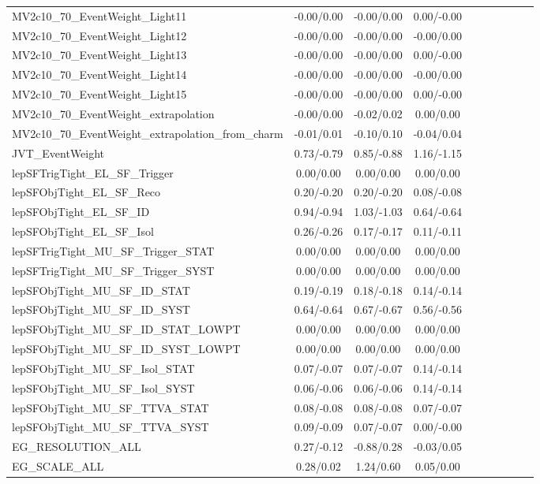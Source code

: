\begin{table}[h]
\begin{center}
\begin{tabular}{l|ccccccccc}
MV2c10\_70\_EventWeight\_Light11 &-0.00/0.00 &-0.00/0.00 &0.00/-0.00 \\
MV2c10\_70\_EventWeight\_Light12 &-0.00/0.00 &-0.00/0.00 &-0.00/0.00 \\
MV2c10\_70\_EventWeight\_Light13 &-0.00/0.00 &-0.00/0.00 &0.00/-0.00 \\
MV2c10\_70\_EventWeight\_Light14 &-0.00/0.00 &-0.00/0.00 &-0.00/0.00 \\
MV2c10\_70\_EventWeight\_Light15 &-0.00/0.00 &-0.00/0.00 &0.00/-0.00 \\
MV2c10\_70\_EventWeight\_extrapolation &-0.00/0.00 &-0.02/0.02 &0.00/0.00 \\
MV2c10\_70\_EventWeight\_extrapolation\_from\_charm &-0.01/0.01 &-0.10/0.10 &-0.04/0.04 \\
JVT\_EventWeight &0.73/-0.79 &0.85/-0.88 &1.16/-1.15 \\
lepSFTrigTight\_EL\_SF\_Trigger &0.00/0.00 &0.00/0.00 &0.00/0.00 \\
lepSFObjTight\_EL\_SF\_Reco &0.20/-0.20 &0.20/-0.20 &0.08/-0.08 \\
lepSFObjTight\_EL\_SF\_ID &0.94/-0.94 &1.03/-1.03 &0.64/-0.64 \\
lepSFObjTight\_EL\_SF\_Isol &0.26/-0.26 &0.17/-0.17 &0.11/-0.11 \\
lepSFTrigTight\_MU\_SF\_Trigger\_STAT &0.00/0.00 &0.00/0.00 &0.00/0.00 \\
lepSFTrigTight\_MU\_SF\_Trigger\_SYST &0.00/0.00 &0.00/0.00 &0.00/0.00 \\
lepSFObjTight\_MU\_SF\_ID\_STAT &0.19/-0.19 &0.18/-0.18 &0.14/-0.14 \\
lepSFObjTight\_MU\_SF\_ID\_SYST &0.64/-0.64 &0.67/-0.67 &0.56/-0.56 \\
lepSFObjTight\_MU\_SF\_ID\_STAT\_LOWPT &0.00/0.00 &0.00/0.00 &0.00/0.00 \\
lepSFObjTight\_MU\_SF\_ID\_SYST\_LOWPT &0.00/0.00 &0.00/0.00 &0.00/0.00 \\
lepSFObjTight\_MU\_SF\_Isol\_STAT &0.07/-0.07 &0.07/-0.07 &0.14/-0.14 \\
lepSFObjTight\_MU\_SF\_Isol\_SYST &0.06/-0.06 &0.06/-0.06 &0.14/-0.14 \\
lepSFObjTight\_MU\_SF\_TTVA\_STAT &0.08/-0.08 &0.08/-0.08 &0.07/-0.07 \\
lepSFObjTight\_MU\_SF\_TTVA\_SYST &0.09/-0.09 &0.07/-0.07 &0.00/-0.00 \\
EG\_RESOLUTION\_ALL &0.27/-0.12 &-0.88/0.28 &-0.03/0.05 \\
EG\_SCALE\_ALL &0.28/0.02 &1.24/0.60 &0.05/0.00 \\

\end{tabular}
\end{center}
\end{table}
